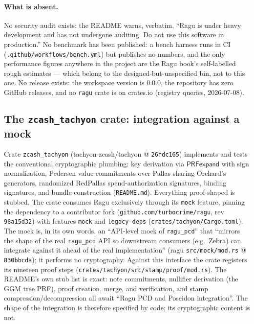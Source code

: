 \documentclass[11pt,a4paper]{article}
\theoremstyle{definition}
\begin{document}
\paragraph{What is absent.}
No security audit exists: the README warns, verbatim, ``Ragu is under heavy
development and has not undergone auditing. Do not use this software in
production.'' No benchmark has been published: a bench harness runs in CI
(\texttt{.github/workflows/bench.yml}) but publishes no numbers, and the
only performance figures anywhere in the project are the Ragu book's
self-labelled rough estimates --- which belong to the
designed-but-unspecified bin, not to this one. No release exists: the
workspace version is 0.0.0, the repository has zero GitHub releases, and no
\texttt{ragu} crate is on crates.io (registry queries, 2026-07-08).

\subsection{The \texttt{zcash\_tachyon} crate: integration against a mock}
\label{sec:tachyon-crate}

Crate \texttt{zcash\_tachyon} (tachyon-zcash/tachyon @ \texttt{26fdc165})
implements and tests the conventional cryptographic plumbing: key derivation
via $\mathsf{PRFexpand}$ with sign normalization, Pedersen value commitments
over Pallas sharing Orchard's generators, randomized RedPallas
spend-authorization signatures, binding signatures, and bundle construction
(\texttt{README.md}). Everything proof-shaped is stubbed. The crate consumes
Ragu exclusively through its \texttt{mock} feature, pinning the dependency
to a contributor fork (\texttt{github.com/turbocrime/ragu}, rev
\texttt{98a15d32}) with features \texttt{mock} and \texttt{legacy-deps}
(\texttt{crates/tachyon/Cargo.toml}). The mock is, in its own words, an
``API-level mock of \texttt{ragu\_pcd}'' that ``mirrors the shape of the
real \texttt{ragu\_pcd} API so downstream consumers (e.g.\ Zebra) can
integrate against it ahead of the real implementation'' (ragu
\texttt{src/mock/mod.rs} @ \texttt{830bbcda}); it performs no cryptography.
Against this interface the crate registers its nineteen proof steps
(\texttt{crates/tachyon/src/stamp/proof/mod.rs}). The README's own stub
list is exact: note commitments, nullifier derivation (the GGM tree PRF),
proof creation, merge, and verification, and stamp
compression/decompression all await ``Ragu PCD and Poseidon integration''.
The shape of the integration is therefore specified by code; its
cryptographic content is not.
\end{document}
